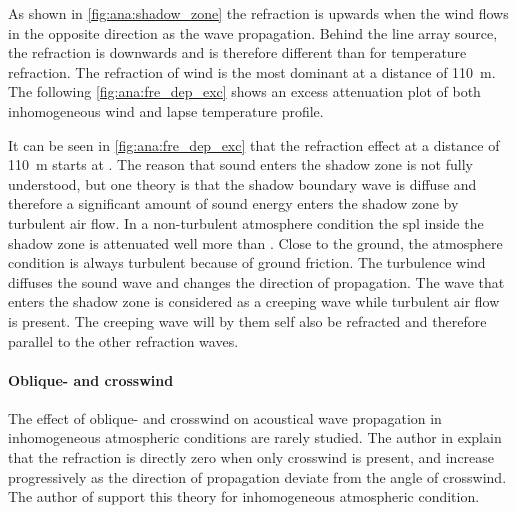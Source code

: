 
As shown in \autoref{fig:ana:shadow_zone} the refraction is upwards when the wind flows in the opposite direction as the wave propagation. Behind the line array source, the refraction is downwards and is therefore different than for temperature refraction. The refraction of wind is the most dominant at a distance of \SI{110}{\meter}. The following \autoref{fig:ana:fre_dep_exc} shows an excess attenuation plot of both inhomogeneous wind and lapse temperature profile. 


It can be seen in \autoref{fig:ana:fre_dep_exc} that the refraction effect at a distance of \SI{110}{\meter} starts at . The reason that sound enters the shadow zone is not fully understood, but one theory is that the shadow boundary wave is diffuse and therefore a significant amount of sound energy enters the shadow zone by turbulent air flow. In a non-turbulent atmosphere condition the \gls{spl} inside the shadow zone is attenuated well more than . Close to the ground, the atmosphere condition is always turbulent because of ground friction. The turbulence wind diffuses the sound wave and changes the direction of propagation. The wave that enters the shadow zone is considered as a creeping wave while turbulent air flow is present. The creeping wave will by them self also be refracted and therefore parallel to the other refraction waves. \citep{tur_on_sound}




\paragraph{Oblique- and crosswind} The effect of oblique- and crosswind on acoustical wave propagation in inhomogeneous atmospheric conditions are rarely studied. The author in \citep{review_of_sound} explain that the refraction is directly zero when only crosswind is present, and increase progressively as the direction of propagation deviate from the angle of crosswind. The author of \citep{no_refraction_1998} support this theory for inhomogeneous atmospheric condition.

